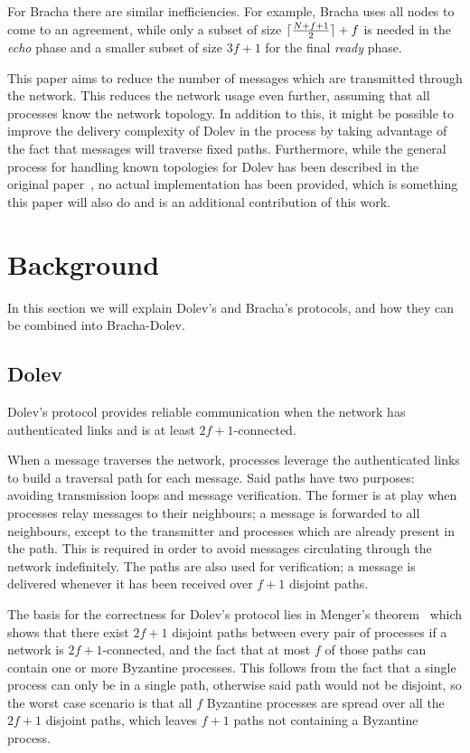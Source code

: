 For Bracha there are similar inefficiencies. For example, Bracha uses all nodes to come to an agreement, while only a subset of size $\lceil\frac{N+f+1}{2}\rceil + f$ is needed in the \textit{echo} phase and a smaller subset of size $3f+1$ for the final \textit{ready} phase.


This paper aims to reduce the number of messages which are transmitted through the network. This reduces the network usage even further, assuming that all processes know the network topology. In addition to this, it might be possible to improve the delivery complexity of Dolev in the process by taking advantage of the fact that messages will traverse fixed paths. Furthermore, while the general process for handling known topologies for Dolev has been described in the original paper~\cite{dolev}, no actual implementation has been provided, which is something this paper will also do and is an additional contribution of this work.


\section{Background}
\label{background}
In this section we will explain Dolev's and Bracha's protocols, and how they can be combined into Bracha-Dolev.

\subsection*{Dolev}
Dolev's protocol provides reliable communication when the network has authenticated links and is at least $2f+1$-connected.

When a message traverses the network, processes leverage the authenticated links to build a traversal path for each message. Said paths have two purposes: avoiding transmission loops and message verification. 
The former is at play when processes relay messages to their neighbours; a message is forwarded to all neighbours, except to the transmitter and processes which are already present in the path. This is required in order to avoid messages circulating through the network indefinitely.
The paths are also used for verification; a message is delivered whenever it has been received over $f+1$ disjoint paths.

The basis for the correctness for Dolev's protocol lies in Menger's theorem~\cite{menger} which shows that there exist $2f+1$ disjoint paths between every pair of processes if a network is $2f+1$-connected, and the fact that at most $f$ of those paths can contain one or more Byzantine processes. This follows from the fact that a single process can only be in a single path, otherwise said path would not be disjoint, so the worst case scenario is that all $f$ Byzantine processes are spread over all the $2f+1$ disjoint paths, which leaves $f+1$ paths not containing a Byzantine process.

